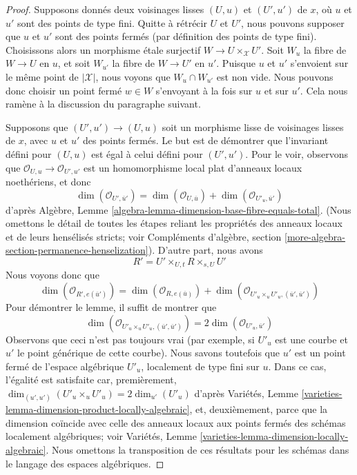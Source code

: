 \begin{proof}
Supposons donnés deux voisinages lisses $(U, u)$ et $(U', u')$
de $x$, où $u$ et $u'$ sont des points de type fini. Quitte à rétrécir $U$
et $U'$, nous pouvons supposer que $u$ et $u'$ sont des points fermés
(par définition des points de type fini). Choisissons alors
un morphisme étale surjectif $W \to U \times_\mathcal{X} U'$.
Soit $W_u$ la fibre de $W \to U$ en $u$, et
soit $W_{u'}$ la fibre de $W \to U'$ en $u'$.
Puisque $u$ et $u'$ s'envoient sur le même point de $|\mathcal{X}|$,
nous voyons que $W_u \cap W_{u'}$ est non vide.
Nous pouvons donc choisir un point fermé $w \in W$ s'envoyant à la fois
sur $u$ et sur $u'$. Cela nous ramène à la discussion du
paragraphe suivant.

\medskip\noindent
Supposons que $(U', u') \to (U, u)$ soit un morphisme lisse de voisinages
lisses de $x$, avec $u$ et $u'$ des points fermés.
Le but est de démontrer que l'invariant défini pour $(U, u)$ est égal
à celui défini pour $(U', u')$.
Pour le voir, observons que $\mathcal{O}_{U, u} \to \mathcal{O}_{U', u'}$
est un homomorphisme local plat d'anneaux locaux noethériens, et donc
$$
\dim(\mathcal{O}_{U', \overline{u}'}) =
\dim(\mathcal{O}_{U, \overline{u}}) +
\dim(\mathcal{O}_{U'_u, \overline{u}'})
$$
d'après Algèbre, Lemme \ref{algebra-lemma-dimension-base-fibre-equals-total}.
(Nous omettons le détail de toutes les étapes reliant les propriétés des anneaux
locaux et de leurs hensélisés stricts; voir
Compléments d'algèbre, section \ref{more-algebra-section-permanence-henselization}).
D'autre part, nous avons
$$
R' = U' \times_{U, t} R \times_{s, U} U'
$$
Nous voyons donc que
$$
\dim(\mathcal{O}_{R', e(\overline{u}')}) =
\dim(\mathcal{O}_{R, e(\overline{u})}) +
\dim(\mathcal{O}_{U'_u \times_u U'_u, (\overline{u}', \overline{u}')})
$$
Pour démontrer le lemme, il suffit de montrer que
$$
\dim(\mathcal{O}_{U'_u \times_u U'_u, (\overline{u}', \overline{u}')}) =
2\dim(\mathcal{O}_{U'_u, \overline{u}'})
$$
Observons que ceci n'est pas toujours vrai (par exemple, si $U'_u$ est une courbe
et $u'$ le point générique de cette courbe). Nous savons toutefois
que $u'$ est un point fermé de l'espace algébrique $U'_u$, localement
de type fini sur $u$. Dans ce cas, l'égalité est satisfaite car, premièrement,
$\dim_{(u', u')}(U'_u \times_u U'_u) = 2\dim_{u'}(U'_u)$ d'après
Variétés, Lemme \ref{varieties-lemma-dimension-product-locally-algebraic},
et, deuxièmement, parce que la dimension coïncide avec celle des anneaux locaux
aux points fermés des schémas localement algébriques; voir
Variétés, Lemme \ref{varieties-lemma-dimension-locally-algebraic}.
Nous omettons la transposition de ces résultats pour les schémas dans le
langage des espaces algébriques.
\end{proof}

